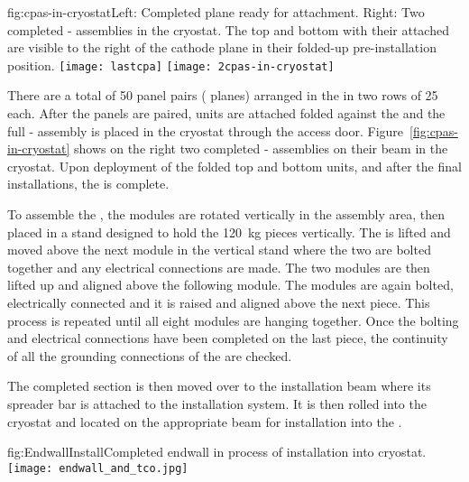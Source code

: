 \begin{dunefigure}{fig:cpas-in-cryostat}{Left: Completed   plane ready for  attachment. Right: Two completed - assemblies in the  cryostat. The top and bottom  with their  attached are visible to the right of the cathode plane in their folded-up pre-installation position.}
\texttt{[image: lastcpa]}
\texttt{[image: 2cpas-in-cryostat]}
\end{dunefigure}

There are a total of 50  panel pairs ( planes) arranged in the %
 in two rows of 25 each.  After the panels are paired,  units are attached folded against the  and the full - assembly is placed in the  cryostat through the access door.  Figure~\ref{fig:cpas-in-cryostat} shows on the right two completed - assemblies on their beam in the  cryostat. Upon deployment of the folded top and bottom  units, and after the final  installations, the   is complete.

To assemble the , the modules are rotated vertically in the assembly area, then placed in a stand designed to hold the \SI{120}{\kg} pieces vertically. The  is lifted and moved above the next module in the vertical stand where the two are bolted together and any electrical connections are made. The two modules are then lifted up and aligned above the following module.  The modules are again bolted, electrically connected and it is raised and aligned above the next piece.  This process is repeated until all eight modules are hanging together.  Once the bolting and electrical connections have been completed on the last piece, the continuity of all the grounding connections of the  are checked.
 
The completed  section is then moved over to the installation beam where its spreader bar is attached to the installation system.  It is then rolled into the cryostat and located on the appropriate beam for installation into the .

\begin{dunefigure}{fig:EndwallInstall}{Completed endwall in process of installation into  cryostat.}
\texttt{[image: endwall\_and\_tco.jpg]}
\end{dunefigure}



